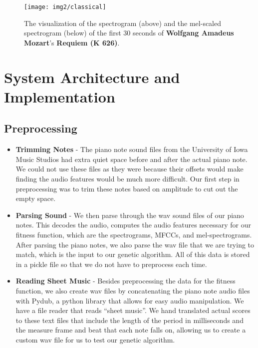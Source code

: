 \documentclass{pnastwo}
\begin{document}
\begin{article}
\begin{figure}
\centerline{\texttt{[image: img2/classical]}}
\caption{The visualization of the spectrogram (above) and the mel-scaled spectrogram (below) of the first 30 seconds of \textbf{Wolfgang Amadeus Mozart}'s \textbf{Requiem (K 626)}.}\label{fig3}
\end{figure}


\section{System Architecture and Implementation}
\subsection{Preprocessing}
 \begin{itemize}
 \item \textbf{Trimming Notes} - 
 The piano note sound files from the University of Iowa Music Studios had extra quiet space before and after the actual piano note. We could not use these files as they were because their offsets would make finding the audio features would be much more difficult. Our first step in preprocessing was to trim these notes based on amplitude to cut out the empty space.\\
 
 \item \textbf{Parsing Sound} -
 We then parse through the wav sound files of our piano notes. This decodes the audio, computes the audio features necessary for our fitness function, which are the spectrograms, MFCCs, and mel-spectrograms. After parsing the piano notes, we also parse the wav file that we are trying to match, which is the input to our genetic algorithm. All of this data is stored in a pickle file so that we do not have to preprocess each time.\\
 
 \item \textbf{Reading Sheet Music} -
 Besides preprocessing the data for the fitness function, we also create wav files by concatenating the piano note audio files with Pydub, a python library that allows for easy audio manipulation. We have a file reader that reads ``sheet music''. We hand translated actual scores to these text files that include the length of the period in milliseconds and the measure frame and beat that each note falls on, allowing us to create a custom wav file for us to test our genetic algorithm.\\
\end{itemize}

\end{article}
\end{document}
